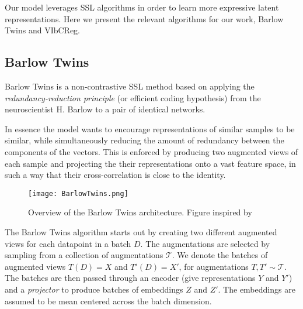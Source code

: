 \documentclass[../../thesis.tex]{subfiles}
\begin{document}
Our model leverages SSL algorithms in order to learn more expressive latent representations. Here we present the relevant algorithms for our work, Barlow Twins and VIbCReg.

\subsection{Barlow Twins}
Barlow Twins is a non-contrastive SSL method based on applying the \textit{redundancy-reduction principle} (or efficient coding hypothesis) \cite{Barlow_origin} from the neuroscientist H. Barlow to a pair of identical networks.\newline  

In essence the model wants to encourage representations of similar samples to be similar, while simultaneously reducing the amount of redundancy between the components of the vectors. This is enforced by producing two augmented views of each sample and projecting the their representations onto a vast feature space, in such a way that their cross-correlation is close to the identity. \newline

\begin{figure}[h]
    \texttt{[image: BarlowTwins.png]}
    \centering    
    \caption{Overview of the Barlow Twins architecture. Figure inspired by \cite{zbontar2021barlow}}
\end{figure}

The Barlow Twins algorithm starts out by creating two different augmented views for each datapoint in a batch $D$. The augmentations are selected by sampling from a collection of augmentations $\mathcal{T}$. We denote the batches of augmented views $T(D) = X$ and $T'(D) =X'$, for augmentations $T,T'\sim \mathcal{T}$.  The batches are then passed through an encoder (give representations $Y$ and $Y'$) and a \textit{projector} to produce batches of embeddings $Z$ and $Z'$. The embeddings are assumed to be mean centered across the batch dimension. \newline
\end{document}

